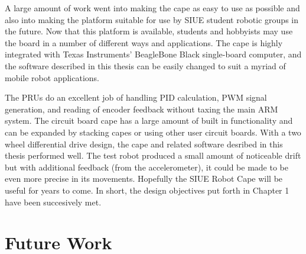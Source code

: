 \documentclass[12pt,oneside,final]{siuethesis}
\theoremstyle{definition}
\begin{document}
A large amount of work went into making the cape as easy to use as possible and also into making the platform suitable for use by SIUE student robotic groups in the future. Now that this platform is available, students and hobbyists may use the board in a number of different ways and applications. The cape is highly integrated with Texas Instruments' BeagleBone Black single-board computer, and the software described in this thesis can be easily changed to suit a myriad of mobile robot applications. 

The PRUs do an excellent job of handling PID calculation, PWM signal generation, and reading of encoder feedback without taxing the main ARM system. The circuit board cape has a large amount of built in functionality and can be expanded by stacking capes or using other user circuit boards. With a two wheel differential drive design, the cape and related software desribed in this thesis performed well. The test robot produced a small amount of noticeable drift but with additional feedback (from the accelerometer), it could be made to be even more precise in its movements. Hopefully the SIUE Robot Cape will be useful for years to come.  In short, the design objectives put forth in Chapter 1 have been succesively met.

\section{Future Work}
\end{document}
